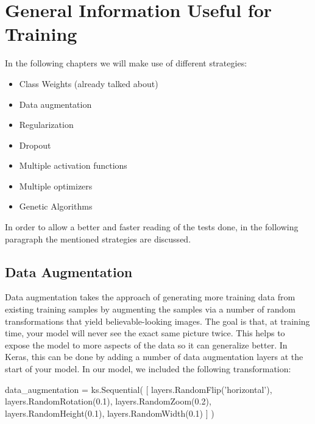 \section{General Information Useful for Training}
In the following chapters we will make use of different strategies:
\begin{itemize}
\item Class Weights (already talked about)
\item Data augmentation
\item Regularization
\item Dropout
\item Multiple activation functions
\item Multiple optimizers
\item Genetic Algorithms
\end{itemize}
In order to allow a better and faster reading of the tests done, in the following paragraph the mentioned strategies are discussed.

\subsection{Data Augmentation}
Data augmentation takes the approach of generating more training data from existing training samples by augmenting the samples via a number of random transformations that yield believable-looking images. The goal is that, at training time, your model will never see the exact same picture twice. This helps to expose the model to more aspects of the data so it can generalize better.
In Keras, this can be done by adding a number of data augmentation layers at the start of your model. In our model, we included the following transformation:

\begin{python}
data_augmentation = ks.Sequential(
    [
        layers.RandomFlip('horizontal'),
        layers.RandomRotation(0.1),
        layers.RandomZoom(0.2),
        layers.RandomHeight(0.1),
        layers.RandomWidth(0.1)
    ]
)
\end{python}

